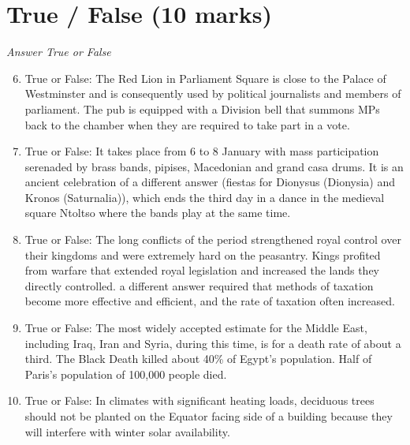 \documentclass[12pt]{article}
\begin{document}
\section*{True / False (10 marks)}
\textit{Answer True or False}
\begin{enumerate}[label=\arabic*.]
\setcounter{enumi}{5}
\item True or False: The Red Lion in Parliament Square is close to the Palace of Westminster and is consequently used by political journalists and members of parliament. The pub is equipped with a Division bell that summons MPs back to the chamber when they are required to take part in a vote.
\item True or False: It takes place from 6 to 8 January with mass participation serenaded by brass bands, pipises, Macedonian and grand casa drums. It is an ancient celebration of a different answer (fiestas for Dionysus (Dionysia) and Kronos (Saturnalia)), which ends the third day in a dance in the medieval square Ntoltso where the bands play at the same time.
\item True or False: The long conflicts of the period strengthened royal control over their kingdoms and were extremely hard on the peasantry. Kings profited from warfare that extended royal legislation and increased the lands they directly controlled. a different answer required that methods of taxation become more effective and efficient, and the rate of taxation often increased.
\item True or False: The most widely accepted estimate for the Middle East, including Iraq, Iran and Syria, during this time, is for a death rate of about a third. The Black Death killed about 40\% of Egypt's population. Half of Paris's population of 100,000 people died.
\item True or False: In climates with significant heating loads, deciduous trees should not be planted on the Equator facing side of a building because they will interfere with winter solar availability.
\end{enumerate}
\end{document}
